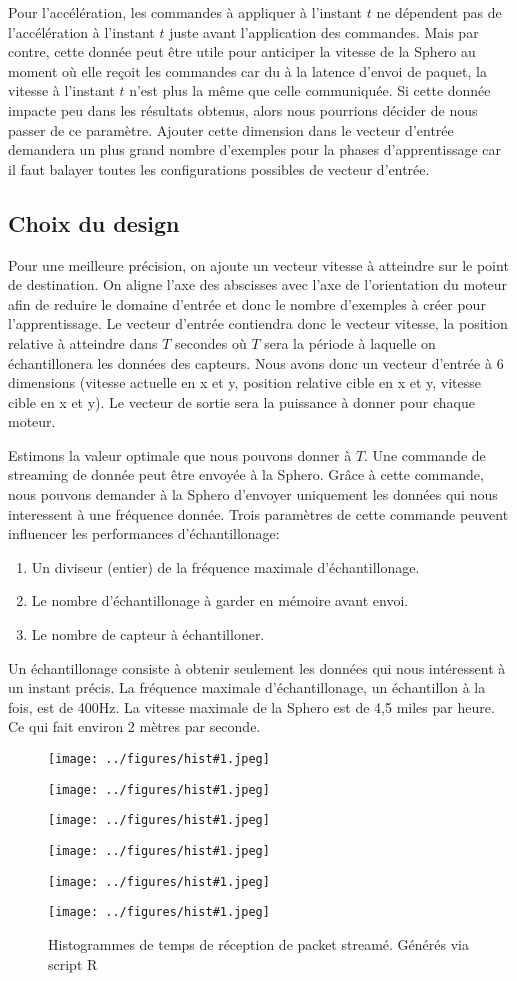 Pour l'accélération, les commandes à appliquer à l'instant $t$ ne dépendent pas de l'accélération à l'instant $t$ juste avant l'application des commandes.
Mais par contre, cette donnée peut être utile pour anticiper la vitesse de la Sphero au moment où elle reçoit les commandes car du à la latence d'envoi de paquet, la vitesse à l'instant $t$ n'est plus la même que celle communiquée.
Si cette donnée impacte peu dans les résultats obtenus, alors nous pourrions décider de nous passer de ce paramètre.
Ajouter cette dimension dans le vecteur d'entrée demandera un plus grand nombre d'exemples pour la phases d'apprentissage car il faut balayer toutes les configurations possibles de vecteur d'entrée.

\newcommand{\inchist}[1]{
 \begin{minipage}{0.48\textwidth}
  \texttt{[image: ../figures/hist\#1.jpeg]}
 \end{minipage}
}
\subsection{Choix du design}\label{sec:choixdesign}
Pour une meilleure précision, on ajoute un vecteur vitesse à atteindre sur le point de destination.
On aligne l'axe des abscisses avec l'axe de l'orientation du moteur afin de reduire le domaine d'entrée et donc le nombre d'exemples à créer pour l'apprentissage.
Le vecteur d'entrée contiendra donc le vecteur vitesse, la position relative à atteindre dans $T$ secondes où $T$ sera la période à laquelle on échantillonera les données des capteurs.
Nous avons donc un vecteur d'entrée à 6 dimensions (vitesse actuelle en x et y, position relative cible en x et y, vitesse cible en x et y).
Le vecteur de sortie sera la puissance à donner pour chaque moteur.

Estimons la valeur optimale que nous pouvons donner à $T$.
Une commande de streaming de donnée peut être envoyée à la Sphero.
Grâce à cette commande, nous pouvons demander à la Sphero d'envoyer uniquement les données qui nous interessent à une fréquence donnée.
Trois paramètres de cette commande peuvent influencer les performances d'échantillonage:
\begin{enumerate}
 \item Un diviseur (entier) de la fréquence maximale d'échantillonage.
 \item Le nombre d'échantillonage à garder en mémoire avant envoi.
 \item Le nombre de capteur à échantilloner.
\end{enumerate}
Un échantillonage consiste à obtenir seulement les données qui nous intéressent à un instant précis.
La fréquence maximale d'échantillonage, un échantillon à la fois, est de 400Hz.\cite{SDKofficiels}
La vitesse maximale de la Sphero est de 4,5 miles par heure.\cite{product} Ce qui fait environ 2 mètres par seconde.
\begin{figure}
 \centering
 \inchist{20}
 \inchist{40}
 \inchist{60}
 \inchist{80}
 \inchist{100}
 \inchist{200}
 \caption{Histogrammes de temps de réception de packet streamé. Générés via script R}
 \label{histogrammes}
\end{figure}

